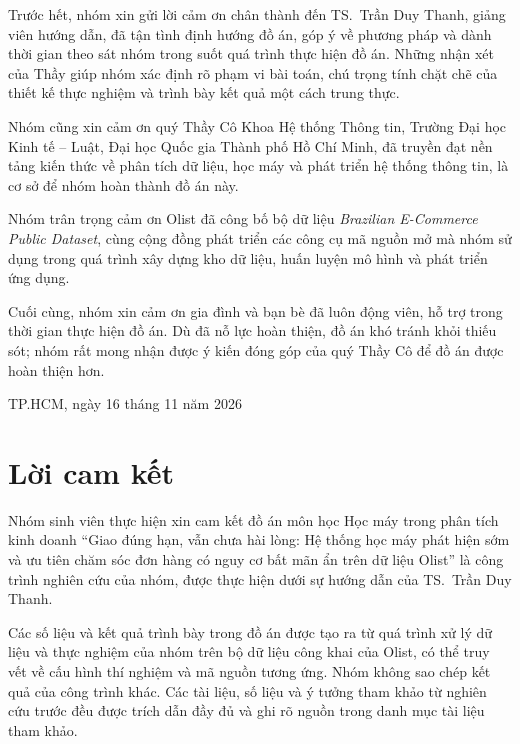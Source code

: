 \documentclass[12pt,a4paper]{report}
\begin{document}
Trước hết, nhóm xin gửi lời cảm ơn chân thành đến TS.~Trần Duy Thanh, giảng viên hướng dẫn, đã tận tình định hướng đồ án, góp ý về phương pháp và dành thời gian theo sát nhóm trong suốt quá trình thực hiện đồ án. Những nhận xét của Thầy giúp nhóm xác định rõ phạm vi bài toán, chú trọng tính chặt chẽ của thiết kế thực nghiệm và trình bày kết quả một cách trung thực.

Nhóm cũng xin cảm ơn quý Thầy Cô Khoa Hệ thống Thông tin, Trường Đại học Kinh tế -- Luật, Đại học Quốc gia Thành phố Hồ Chí Minh, đã truyền đạt nền tảng kiến thức về phân tích dữ liệu, học máy và phát triển hệ thống thông tin, là cơ sở để nhóm hoàn thành đồ án này.

Nhóm trân trọng cảm ơn Olist đã công bố bộ dữ liệu \emph{Brazilian E-Commerce Public Dataset}, cùng cộng đồng phát triển các công cụ mã nguồn mở mà nhóm sử dụng trong quá trình xây dựng kho dữ liệu, huấn luyện mô hình và phát triển ứng dụng.

Cuối cùng, nhóm xin cảm ơn gia đình và bạn bè đã luôn động viên, hỗ trợ trong thời gian thực hiện đồ án. Dù đã nỗ lực hoàn thiện, đồ án khó tránh khỏi thiếu sót; nhóm rất mong nhận được ý kiến đóng góp của quý Thầy Cô để đồ án được hoàn thiện hơn.

\vspace{1cm}
\begin{flushright}
\begin{minipage}{0.5\linewidth}\centering
TP.HCM, ngày 16 tháng 11 năm 2026\\
\end{minipage}
\end{flushright}

\chapter*{Lời cam kết}

Nhóm sinh viên thực hiện xin cam kết đồ án môn học Học máy trong phân tích kinh doanh ``Giao đúng hạn, vẫn chưa hài lòng: Hệ thống học máy phát hiện sớm và ưu tiên chăm sóc đơn hàng có nguy cơ bất mãn ẩn trên dữ liệu Olist'' là công trình nghiên cứu của nhóm, được thực hiện dưới sự hướng dẫn của TS.~Trần Duy Thanh.

Các số liệu và kết quả trình bày trong đồ án được tạo ra từ quá trình xử lý dữ liệu và thực nghiệm của nhóm trên bộ dữ liệu công khai của Olist, có thể truy vết về cấu hình thí nghiệm và mã nguồn tương ứng. Nhóm không sao chép kết quả của công trình khác. Các tài liệu, số liệu và ý tưởng tham khảo từ nghiên cứu trước đều được trích dẫn đầy đủ và ghi rõ nguồn trong danh mục tài liệu tham khảo.
\end{document}

